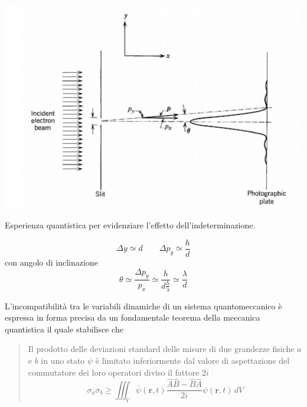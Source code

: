 \begin{marginfigure}
    \includegraphics[width = 1.3 \textwidth, height = 1.3 \textheight]{figs/beam-electron-experiment}
    \caption{Esperienza quantistica per evidenziare l'effetto dell'indeterminazione.}
    \label{fig:beam-electron-experiment}
\end{marginfigure}

\[
    \Delta y \simeq d \qquad \Delta p_{y} \simeq \frac{h}{d}
\] con angolo di inclinazione
\[
    \theta \simeq \frac{\Delta p_{y}}{p_{x}} \simeq \frac{h}{d \frac{h}{\lambda}} \simeq \frac{\lambda}{d}
\]
\bigskip

L'incompatibilità tra le variabili dinamiche di un sistema
quantomeccanico è espressa in forma precisa da un fondamentale teorema
della meccanica quantistica il quale stabilisce che

\begin{quote}
    Il prodotto delle deviazioni standard delle misure di due grandezze
    fisiche \(a\) e \(b\) in uno stato \(\psi\) è limitato inferiormente dal
    valore di aspettazione del commutatore dei loro operatori diviso il
    fattore \(2i\)
    \begin{equation}
        \boxed{\sigma_{a} \sigma_{b} \geq \iiint_{V} \bar{\psi}(\bm{r},t) \frac{\hat{A}\hat{B} -\hat{B}\hat{A}}{2i}
        \psi(\bm{r},t) \, dV}
        \label{eq:sigma-product-commutator-theorem}
    \end{equation}
\end{quote}

